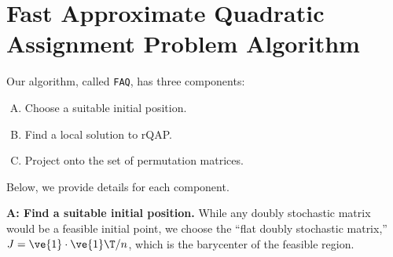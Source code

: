 \documentclass[10pt,journal,cspaper,compsoc]{IEEEtran}
\begin{document}





\section{Fast Approximate Quadratic Assignment Problem Algorithm} %
\label{sec:faq}


Our algorithm, called \texttt{FAQ}, has three components:
\begin{enumerate}[A.]
	\item Choose a suitable initial position. %
	\item Find a local solution to rQAP. %
	\item Project onto the set of permutation matrices. %
\end{enumerate}
Below, we provide details for each component.

\textbf{A: Find a suitable initial position.}  While any doubly stochastic matrix would be a feasible initial point, we choose the 
``flat doubly  stochastic matrix,'' $J=\ve{1} \cdot \ve{1}\T/n$, which is the barycenter of the feasible region.
\end{document}

